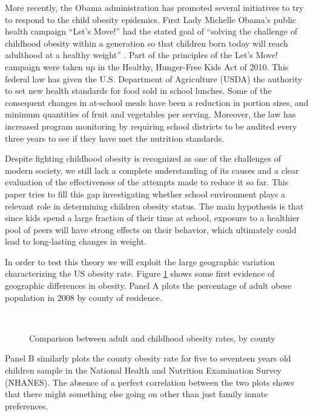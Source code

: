 \documentclass[twoside,12pt]{article}
\begin{document}
More recently, the Obama administration has promoted several initiatives to try to respond to the child obesity epidemics. First Lady Michelle Obama's public health campaign ``Let's Move!'' had the stated goal of ``solving the challenge of childhood obesity within a generation so that children born today will reach adulthood at a healthy weight'' \citep{letsmove}. Part of the principles of the Let's Move! campaign were taken up in the Healthy, Hunger-Free Kids Act of 2010. This federal law has given the U.S. Department of Agriculture (USDA) the authority to set new health standards for food sold in school lunches. Some of the consequent changes in at-school meals have been a reduction in portion sizes, and minimum quantities of fruit and vegetables per serving. Moreover, the law has increased program monitoring by requiring school districts to be audited every three years to see if they have met the nutrition standards.

Despite fighting childhood obesity is recognized as one of the challenges of modern society, we still lack a complete understanding of its causes and a clear evaluation of the effectiveness of the attempts made to reduce it so far. This paper tries to fill this gap investigating whether school environment plays a relevant role in determining children obesity status. The main hypothesis is that since kids spend a large fraction of their time at school, exposure to a healthier pool of peers will have strong effects on their behavior, which ultimately could lead to long-lasting changes in weight.

In order to test this theory we will exploit the large geographic variation characterizing the US obesity rate. Figure \ref{fig:adult_vs_childen} shows some first evidence of geographic differences in obesity. Panel A plots the percentage of adult obese population in 2008 by county of residence.
\begin{figure}[htp]
	\centering
	 \\ \vspace{5mm}
	\caption{Comparison between adult and childhood obesity rates, by county}
	\label{fig:adult_vs_childen}
\end{figure}
Panel B similarly plots the county obesity rate for five to seventeen years old children sample in the National Health and Nutrition Examination Survey (NHANES). The absence of a perfect correlation between the two plots shows that there might something else going on other than just family innate preferences.
\end{document}
